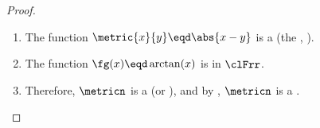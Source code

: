 {\begin{example}
\begin{minipage}{\tw/4}
\begin{center}
\begin{fsL}
\begin{picture}
  \end{picture}
  \end{fsL}
  \end{center}
\end{minipage}%
\end{example}
\begin{proof}
\begin{enumerate}
  \item The function $\metric{x}{y}\eqd\abs{x-y}$ is a  (the , ).
  \item The function  $\fg(x)\eqd\arctan(x)$ is  in $\clFrr$.
  \item Therefore, $\metricn$ is a  (or ), 
        and by , $\metricn$ is a .
\end{enumerate}
\end{proof}

}
